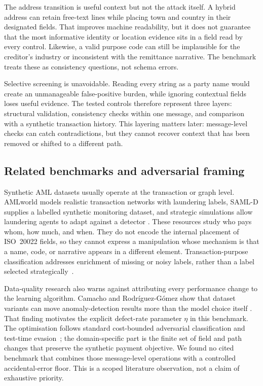 \documentclass[conference]{IEEEtran}
\begin{document}
The address transition is useful context but not the attack itself. A hybrid
address can retain free-text lines while placing town and country in their
designated fields. That improves machine readability, but it does not guarantee
that the most informative identity or location evidence sits in a field read
by every control. Likewise, a valid purpose code can still be implausible for
the creditor's industry or inconsistent with the remittance narrative. The
benchmark treats these as consistency questions, not schema errors.

Selective screening is unavoidable. Reading every string as a party name
would create an unmanageable false-positive burden, while ignoring contextual
fields loses useful evidence. The tested controls therefore represent three
layers: structural validation, consistency checks within one message, and
comparison with a synthetic transaction history. This layering matters later:
message-level checks can catch contradictions, but they cannot recover context
that has been removed or shifted to a different path.

\subsection{Related benchmarks and adversarial framing}
Synthetic AML datasets usually operate at the transaction or graph level.
AMLworld models realistic transaction networks with laundering labels,
SAML-D supplies a labelled synthetic monitoring dataset, and strategic
simulations allow laundering agents to adapt against a detector
\cite{altman2023,oztas2023,wang2025}. These resources study who pays whom, how
much, and when. They do not encode the internal placement of ISO~20022 fields,
so they cannot express a manipulation whose mechanism is that a name, code, or
narrative appears in a different element. Transaction-purpose classification
addresses enrichment of missing or noisy labels, rather than a label selected
strategically~\cite{busson2023}.

Data-quality research also warns against attributing every performance change
to the learning algorithm. Camacho and Rodr\'iguez-G\'omez show that dataset
variants can move anomaly-detection results more than the model choice itself
\cite{camacho2025}. That finding motivates the explicit defect-rate parameter
$\eta$ in this benchmark. The optimisation follows standard cost-bounded
adversarial classification and test-time evasion~\cite{bruckner2011,biggio2013};
the domain-specific part is the finite set of field and path changes that
preserve the synthetic payment objective. We found no cited benchmark that
combines those message-level operations with a controlled accidental-error
floor. This is a scoped literature observation, not a claim of exhaustive
priority.
\end{document}
